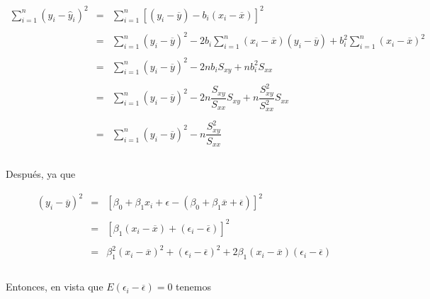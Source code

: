 $$
\begin{array}{rcl}
    \displaystyle\sum_{i=1}^n\left(y_i-\hat{y}_i\right)^2 &=& \displaystyle\sum_{i=1}^n\left[\left(y_i-\overline{y}\right)-b_i\left(x_i-\overline{x}\right)\right]^2\\\\
							  &=& \displaystyle\sum_{i=1}^n\left(y_i-\overline{y}\right)^2-2b_i\displaystyle\sum_{i=1}^n\left(x_i-\overline{x}\right)\left(y_i-\overline{y}\right)+b_i^2\displaystyle\sum_{i=1}^n\left(x_i-\overline{x}\right)^2\\\\
							  &=& \displaystyle\sum_{i=1}^n\left(y_i-\overline{y}\right)^2-2nb_iS_{xy}+n b_i^2S_{xx}\\\\
							  &=& \displaystyle\sum_{i=1}^n\left(y_i-\overline{y}\right)^2-2n\dfrac{S_{xy}}{S_{xx}}S_{xy}+n\dfrac{S_{xy}^2}{S_{xx}^2}S_{xx}\\\\
							  &=& \displaystyle\sum_{i=1}^n\left(y_i-\overline{y}\right)^2-n\dfrac{S_{xy}^2}{S_{xx}}\\\\
\end{array}
$$

Después, ya que 

$$
\begin{array}{rcl}
    \left(y_i-\overline{y}\right)^2&=&\left[\beta_0+\beta_1x_i+\epsilon -\left(\beta_0+\beta_1\overline{x}+\overline{\epsilon}\right)\right]^2\\\\
				   &=&\left[\beta_1\left(x_i-\overline{x}\right)+\left(\epsilon_i-\overline{\epsilon}\right)\right]^2\\\\
				   &=& \beta_1^2\left(x_i-\overline{x}\right)^2+\left(\epsilon_i-\overline{\epsilon}\right)^2+2\beta_1\left(x_i-\overline{x}\right)\left(\epsilon_i-\overline{\epsilon}\right)\\\\
\end{array}
$$

Entonces, en vista que $E\left(\epsilon_i-\overline{\epsilon}\right)=0$ tenemos 

